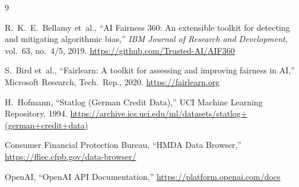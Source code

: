 \documentclass[11pt,a4paper]{article}
\begin{document}
\begin{thebibliography}{9}

R.~K.~E.~Bellamy et~al.,
``AI Fairness 360: An extensible toolkit for detecting and mitigating
algorithmic bias,''
\textit{IBM Journal of Research and Development}, vol.~63, no.~4/5, 2019.
\url{https://github.com/Trusted-AI/AIF360}

S.~Bird et~al.,
``Fairlearn: A toolkit for assessing and improving fairness in AI,''
Microsoft Research, Tech.\ Rep., 2020.
\url{https://fairlearn.org}

H.~Hofmann,
``Statlog (German Credit Data),''
UCI Machine Learning Repository, 1994.
\url{https://archive.ics.uci.edu/ml/datasets/statlog+(german+credit+data)}

Consumer Financial Protection Bureau,
``HMDA Data Browser,''
\url{https://ffiec.cfpb.gov/data-browser/}

OpenAI,
``OpenAI API Documentation,''
\url{https://platform.openai.com/docs}

\end{thebibliography}
\end{document}
